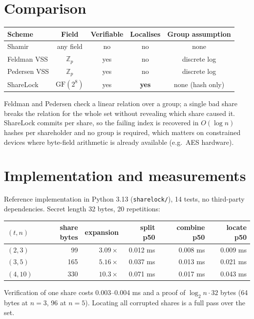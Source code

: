 \documentclass[11pt]{article}
\begin{document}
\section{Comparison}
\begin{center}
\begin{tabular}{lcccc}
\toprule
Scheme & Field & Verifiable & Localises & Group assumption \\
\midrule
Shamir \cite{shamir} & any field & no & no & none \\
Feldman VSS \cite{feldman} & $\mathbb{Z}_p$ & yes & no & discrete log \\
Pedersen VSS \cite{pedersen} & $\mathbb{Z}_p$ & yes & no & discrete log \\
ShareLock & $\mathrm{GF}(2^8)$ & yes & \textbf{yes} & none (hash only) \\
\bottomrule
\end{tabular}
\end{center}

Feldman and Pedersen check a linear relation over a group; a single bad share breaks the relation for
the whole set without revealing which share caused it. ShareLock commits per share, so the failing
index is recovered in $O(\log n)$ hashes per shareholder and no group is required, which matters on
constrained devices where byte-field arithmetic is already available (e.g.\ AES hardware).

\section{Implementation and measurements}
Reference implementation in Python 3.13 (\texttt{sharelock/}), 14 tests, no third-party
dependencies. Secret length 32 bytes, 20 repetitions:

\begin{center}
\begin{tabular}{lrrrrr}
\toprule
$(t,n)$ & share bytes & expansion & split p50 & combine p50 & locate p50 \\
\midrule
$(2,3)$ & 99 & $3.09\times$ & 0.012 ms & 0.008 ms & 0.009 ms \\
$(3,5)$ & 165 & $5.16\times$ & 0.037 ms & 0.013 ms & 0.021 ms \\
$(4,10)$ & 330 & $10.3\times$ & 0.071 ms & 0.017 ms & 0.043 ms \\
\bottomrule
\end{tabular}
\end{center}

Verification of one share costs 0.003--0.004 ms and a proof of $\log_2 n \cdot 32$ bytes
(64 bytes at $n=3$, 96 at $n=5$). Locating all corrupted shares is a full pass over the set.
\end{document}
